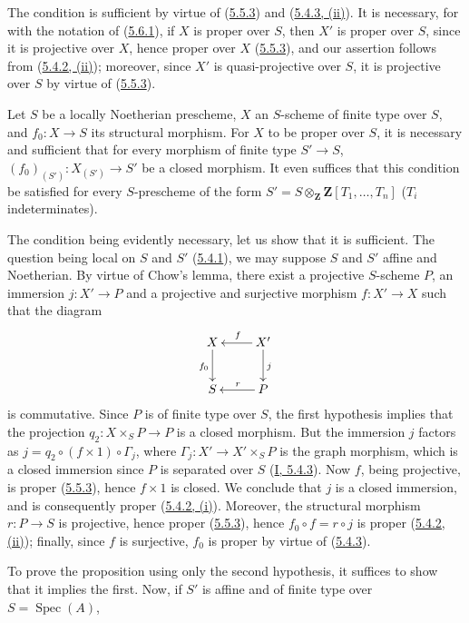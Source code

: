 The condition is sufficient by virtue of (\hyperref[II.5.5.3]{5.5.3}) and
(\hyperref[II.5.4.3]{5.4.3, (ii)}). It is necessary, for with the
notation of (\hyperref[II.5.6.1]{5.6.1}), if $X$ is proper over $S$, then
$X'$ is proper over $S$, since it is projective over $X$, hence proper over
$X$ (\hyperref[II.5.5.3]{5.5.3}), and our assertion follows from
(\hyperref[II.5.4.2]{5.4.2, (ii)}); moreover, since $X'$ is
quasi-projective over $S$, it is projective over $S$ by virtue of
(\hyperref[II.5.5.3]{5.5.3}).

\begin{corollary}[5.6.3]
\label{II.5.6.3}
Let $S$ be a locally Noetherian prescheme, $X$ an $S$-scheme of finite type
over $S$, and $f_0:X\to S$ its structural morphism. For $X$ to be proper
over $S$, it is necessary and sufficient that for every morphism of finite
type $S'\to S$, $(f_0)_{(S')}:X_{(S')}\to S'$ be a closed morphism. It even
suffices that this condition be satisfied for every $S$-prescheme of the form
$S'=S\otimes_{\mathbf Z}\mathbf Z[T_1,\ldots,T_n]$ ($T_i$ indeterminates).
\end{corollary}

The condition being evidently necessary, let us show that it is sufficient.
The question being local on $S$ and $S'$ (\hyperref[II.5.4.1]{5.4.1}), we
may suppose $S$ and $S'$ affine and Noetherian. By virtue of Chow's lemma,
there exist a projective $S$-scheme $P$, an immersion $j:X'\to P$ and a
projective and surjective morphism $f:X'\to X$ such that the diagram
\[
\xymatrix{
X\ar[d]_{f_0} & X'\ar[l]_f\ar[d]^j\\
S & P\ar[l]_r
}
\]
is commutative. Since $P$ is of finite type over $S$, the first hypothesis
implies that the projection $q_2:X\times_SP\to P$ is a closed morphism. But
the immersion $j$ factors as $j=q_2\circ(f\times1)\circ\Gamma_j$,
where $\Gamma_j:X'\to X'\times_SP$ is the graph morphism, which is a
closed immersion since $P$ is separated over $S$
(\hyperref[I.5.4.3]{I, 5.4.3}). Now $f$, being projective, is proper
(\hyperref[II.5.5.3]{5.5.3}), hence $f\times1$ is closed. We conclude that
$j$ is a closed immersion, and is consequently proper
(\hyperref[II.5.4.2]{5.4.2, (i)}). Moreover, the structural morphism
$r:P\to S$ is projective, hence proper (\hyperref[II.5.5.3]{5.5.3}), hence
$f_0\circ f=r\circ j$ is proper
(\hyperref[II.5.4.2]{5.4.2, (ii)}); finally, since $f$ is surjective,
$f_0$ is proper by virtue of (\hyperref[II.5.4.3]{5.4.3}).

To prove the proposition using only the second hypothesis, it suffices to
show that it implies the first. Now, if $S'$ is affine and of finite type
over $S=\operatorname{Spec}(A)$,


